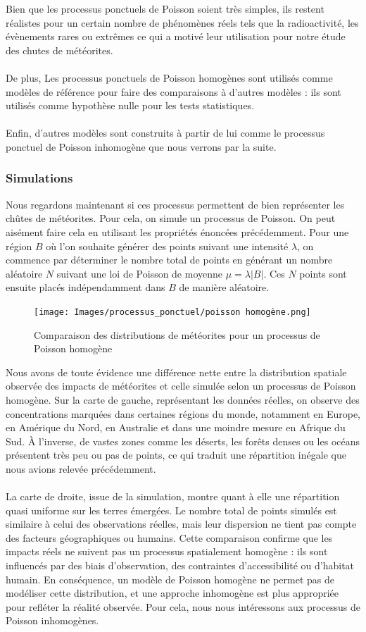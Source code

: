 \documentclass[12pt]{article}
\begin{document}
Bien que les processus ponctuels de Poisson soient très simples, ils restent réalistes pour un certain nombre de phénomènes réels tels que la radioactivité, les évènements rares ou  extrêmes ce qui a motivé leur utilisation pour notre étude des chutes de météorites.\\
\\
De plus, Les processus ponctuels de Poisson homogènes sont utilisés comme modèles de référence pour faire des comparaisons à d'autres modèles : ils sont utilisés comme hypothèse nulle pour les tests statistiques.\\
\\
Enfin, d'autres modèles sont construits à partir de lui comme le processus ponctuel de Poisson inhomogène que nous verrons par la suite.
\subsubsection*{Simulations}
Nous regardons maintenant si ces processus permettent de bien représenter les chûtes de météorites. Pour cela, on simule un processus de Poisson. On peut aisément faire cela en utilisant les propriétés énoncées précédemment. Pour une région $B$ où l'on souhaite générer des points suivant une intensité $\lambda$, on commence par déterminer le nombre total de points en générant un nombre aléatoire $N$ suivant une loi de Poisson de moyenne $\mu = \lambda|B|$. Ces $N$ points sont ensuite placés indépendamment dans $B$ de manière aléatoire.

\begin{figure}[H]
    \centering
    \texttt{[image: Images/processus\_ponctuel/poisson homogène.png]}
    \caption{Comparaison des distributions de météorites pour un processus de Poisson homogène}
\end{figure}
Nous avons de toute évidence une différence nette entre la distribution spatiale observée des impacts de météorites et celle simulée selon un processus de Poisson homogène. Sur la carte de gauche, représentant les données réelles, on observe des concentrations marquées dans certaines régions du monde, notamment en Europe, en Amérique du Nord, en Australie et dans une moindre mesure en Afrique du Sud. À l’inverse, de vastes zones comme les déserts, les forêts denses ou les océans présentent très peu ou pas de points, ce qui traduit une répartition inégale que nous avions relevée précédemment.\\
\\
La carte de droite, issue de la simulation, montre quant à elle une répartition quasi uniforme sur les terres émergées. Le nombre total de points simulés est similaire à celui des observations réelles, mais leur dispersion ne tient pas compte des facteurs géographiques ou humains. Cette comparaison confirme que les impacts réels ne suivent pas un processus spatialement homogène : ils sont influencés par des biais d’observation, des contraintes d’accessibilité ou d’habitat humain. En conséquence, un modèle de Poisson homogène ne permet pas de modéliser cette distribution, et une approche inhomogène est plus appropriée pour refléter la réalité observée. Pour cela, nous nous intéressons aux processus de Poisson inhomogènes.
\end{document}
